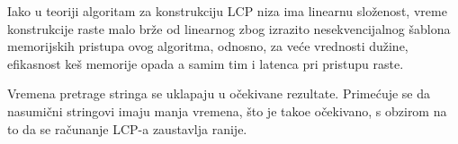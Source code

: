 Iako u teoriji algoritam za konstrukciju LCP niza ima linearnu slo\v zenost, vreme konstrukcije raste malo br\v ze od linearnog zbog izrazito nesekvencijalnog \v sablona memorijskih pristupa ovog algoritma, odnosno, za ve\' ce vrednosti du\v zine, efikasnost ke\v s memorije opada a samim tim i latenca pri pristupu raste.

Vremena pretrage stringa se uklapaju u o\v cekivane rezultate. Prime\' cuje se da nasumi\v cni stringovi imaju manja vremena, \v sto je tako\dj e o\v cekivano, s obzirom na to da se ra\v cunanje LCP-a zaustavlja ranije.